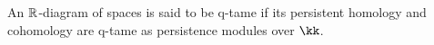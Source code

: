 An $\mathbb{R}$-diagram of spaces is said to be q-tame if its persistent homology and cohomology are q-tame as persistence modules over $\kk$.

%
%
%
